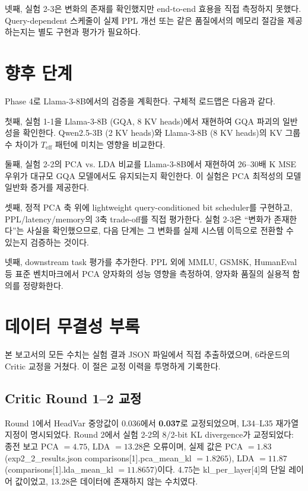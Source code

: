 \documentclass[11pt,a4paper]{article}
\newcommand{\teff}{T_\mathrm{eff}}
\begin{document}
넷째, 실험 2-3은 변화의 존재를 확인했지만 end-to-end 효용을 직접 측정하지 못했다. Query-dependent 스케줄이 실제 PPL 개선 또는 같은 품질에서의 메모리 절감을 제공하는지는 별도 구현과 평가가 필요하다.

\section{향후 단계}

Phase 4로 Llama-3-8B에서의 검증을 계획한다. 구체적 로드맵은 다음과 같다.

첫째, 실험 1-1을 Llama-3-8B (GQA, 8 KV heads)에서 재현하여 GQA 파괴의 일반성을 확인한다. Qwen2.5-3B (2 KV heads)와 Llama-3-8B (8 KV heads)의 KV 그룹 수 차이가 $\teff$ 패턴에 미치는 영향을 비교한다.

둘째, 실험 2-2의 PCA vs. LDA 비교를 Llama-3-8B에서 재현하여 26--30배 K MSE 우위가 대규모 GQA 모델에서도 유지되는지 확인한다. 이 실험은 PCA 최적성의 모델 일반화 증거를 제공한다.

셋째, 정적 PCA 축 위에 lightweight query-conditioned bit scheduler를 구현하고, PPL/latency/memory의 3축 trade-off를 직접 평가한다. 실험 2-3은 ``변화가 존재한다''는 사실을 확인했으므로, 다음 단계는 그 변화를 실제 시스템 이득으로 전환할 수 있는지 검증하는 것이다.

넷째, downstream task 평가를 추가한다. PPL 외에 MMLU, GSM8K, HumanEval 등 표준 벤치마크에서 PCA 양자화의 성능 영향을 측정하여, 양자화 품질의 실용적 함의를 정량화한다.

\section{데이터 무결성 부록}

본 보고서의 모든 수치는 실험 결과 JSON 파일에서 직접 추출하였으며, 6라운드의 Critic 교정을 거쳤다. 이 절은 교정 이력을 투명하게 기록한다.

\subsection{Critic Round 1--2 교정}

Round 1에서 HeadVar 중앙값이 0.036에서 \textbf{0.037}로 교정되었으며, L34--L35 재가열 지정이 명시되었다. Round 2에서 실험 2-2의 8/2-bit KL divergence가 교정되었다: 종전 보고 PCA $= 4.75$, LDA $= 13.28$은 오류이며, 실제 값은 PCA $= 1.83$ (exp2\_2\_results.json comparisons[1].pca\_mean\_kl $= 1.8265$), LDA $= 11.87$ (comparisons[1].lda\_mean\_kl $= 11.8657$)이다. 4.75는 kl\_per\_layer[4]의 단일 레이어 값이었고, 13.28은 데이터에 존재하지 않는 수치였다.
\end{document}
